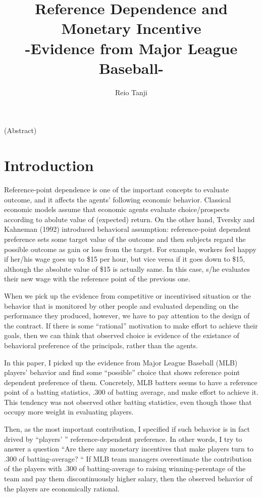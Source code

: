 \documentclass[dvipdfmx]{article}
\begin{document}
\title{Reference Dependence and Monetary Incentive \\
-Evidence from Major League Baseball-}
\author{Reio Tanji}
\date{}
\maketitle

\large

\begin{center}
  (Abstract)
\end{center}


\section{Introduction}

Reference-point dependence is one of the important concepts to
evaluate outcome, and it affects the agents' following
economic behavior. Classical economic models assume that
economic agents evaluate choice/prospects according to abolute
value of (expected) return. On the other hand, Tversky and
Kahneman (1992) introduced behavioral
assumption: reference-point dependent preference sets some
target value of the outcome and then subjects regard the
possible outcome as gain or loss from the target.
For example, workers feel happy if her/his wage goes up
to \$15 per hour, but vice versa if it goes down to \$15,
although the absolute value of \$15 is actually same. In this case,
s/he evaluates their new wage with the reference point of
the previous one.

When we pick up the evidence from competitive or incentivised
situation or the behavior that is monitored by other people
and evaluated depending on the performance they produced,
however, we have to pay attention  to the design of the contract.
If there is some ``rational''
motivation to make effort to achieve their goals,
then we can think that observed
choice is evidence of the existance of behavioral preference of
the principals, rather than the agents.

In this paper, I picked up the evidence from Major League Baseball
(MLB) players' behavior and find some ``possible'' choice that
shows reference point dependent preference of them.
Concretely, MLB batters seems to have a reference point of
a batting statistics, .300 of batting average, and make effort
to achieve it. This tendency was not observed other batting statistics,
even though those that occupy more weight in evaluating players.

Then, as the most important contribution, I specified if
such behavior is in fact drived by ``players' ''
reference-dependent preference. In other words, I try to answer
a question ``Are there any monetary incentives that make players
turn to .300 of batting-average? `` If MLB team managers overestimate
the contribution of the players with .300 of batting-average to
raising winning-perentage of the team and pay them discontinuously
higher salary, then the observed behavior of the players are
economically rational.
\end{document}
